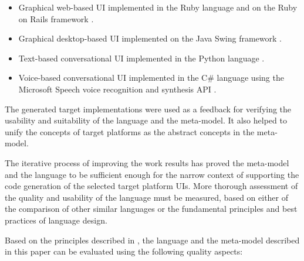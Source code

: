 \documentclass[conference]{IEEEtran}
\begin{document}
\begin{itemize}
  \item Graphical web-based UI implemented in the Ruby language \cite{Ruby10}
    and on the Ruby on Rails framework \cite{Rails10}.
  \item Graphical desktop-based UI implemented on the Java Swing framework
    \cite{JavaxSwing10}.
  \item Text-based conversational UI implemented in the Python language
    \cite{Python10}.
  \item Voice-based conversational UI implemented in the C\# language
    \cite{Csharp10} using the Microsoft Speech voice recognition and synthesis
    API \cite{MsSpeech10}.
\end{itemize}

The generated target implementations were used as a feedback for verifying
the usability and suitability of the language and the meta-model. It also
helped to unify the concepts of target platforms as the abstract concepts in
the meta-model.

The iterative process of improving the work results has proved the meta-model
and the language to be sufficient enough for the narrow context of supporting
the code generation of the selected target platform UIs. More thorough
assessment of the quality and usability of the language must be measured, based
on either of the comparison of other similar languages or the fundamental
principles and best practices of language design.

Based on the principles described in \cite{PaigeOstroffBrooke2000}, the
language and the meta-model described in this paper can be evaluated using the
following quality aspects:
\end{document}
